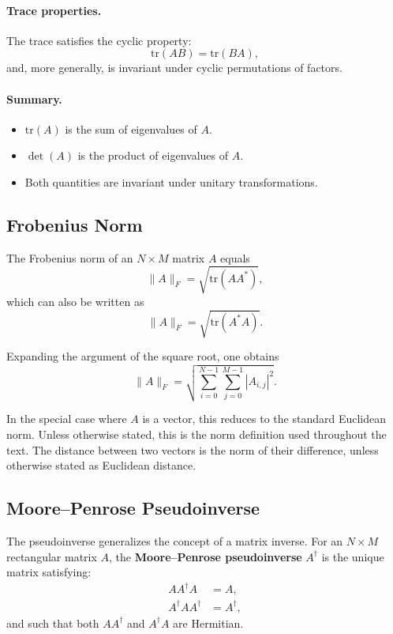 \paragraph{Trace properties.}
The trace satisfies the cyclic property:
\[
\mathrm{tr}(AB) = \mathrm{tr}(BA), \tag{B.26}
\]
and, more generally, is invariant under cyclic permutations of factors.

\paragraph{Summary.}
\begin{itemize}
  \item \(\mathrm{tr}(A)\) is the sum of eigenvalues of \(A\).
  \item \(\det(A)\) is the product of eigenvalues of \(A\).
  \item Both quantities are invariant under unitary transformations.
\end{itemize}

\subsection{Frobenius Norm}

The Frobenius norm of an \( N \times M \) matrix \( A \) equals
\begin{equation}
\|A\|_F = \sqrt{\mathrm{tr}(A A^{*})},
\tag{B.27}
\end{equation}
which can also be written as
\begin{equation}
\|A\|_F = \sqrt{\mathrm{tr}(A^{*} A)}.
\tag{B.28}
\end{equation}

Expanding the argument of the square root, one obtains
\begin{equation}
\|A\|_F = 
\sqrt{
\sum_{i=0}^{N-1}
\sum_{j=0}^{M-1}
|A_{i,j}|^2
}.
\tag{B.29}
\end{equation}

In the special case where \(A\) is a vector, this reduces to the standard Euclidean norm.  
Unless otherwise stated, this is the norm definition used throughout the text.  
The distance between two vectors is the norm of their difference, unless otherwise stated as Euclidean distance.


\subsection{Moore–Penrose Pseudoinverse}

The pseudoinverse generalizes the concept of a matrix inverse.  
For an \( N \times M \) rectangular matrix \(A\), the \textbf{Moore–Penrose pseudoinverse} \(A^{\dagger}\) is the unique matrix satisfying:
\begin{align}
A A^{\dagger} A &= A, \tag{B.30} \\
A^{\dagger} A A^{\dagger} &= A^{\dagger}, \tag{B.31}
\end{align}
and such that both \(A A^{\dagger}\) and \(A^{\dagger} A\) are Hermitian.

